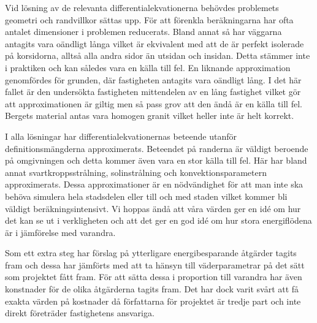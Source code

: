 Vid lösning av de relevanta differentialekvationerna behövdes problemets geometri och randvillkor sättas upp. För
att förenkla beräkningarna har ofta antalet dimensioner i problemen reducerats. Bland annat så har väggarna antagits vara oändligt
långa vilket är ekvivalent med att de är perfekt isolerade på korsidorna, alltså alla andra sidor än utsidan och insidan. Detta stämmer inte
i praktiken och kan således vara en källa till fel. En liknande approximation genomfördes för grunden, där fastigheten
antagits vara oändligt lång. I det här fallet är den undersökta fastigheten mittendelen av en lång fastighet vilket
gör att approximationen är giltig men så pass grov att den ändå är en källa till fel. Bergets material antas vara homogen granit vilket
heller inte är helt korrekt. 

I alla lösningar har differentialekvationernas beteende utanför definitionsmängderna approximerats. Beteendet på randerna
är väldigt beroende på omgivningen och detta kommer även vara en stor källa till fel. Här har bland annat svartkroppsstrålning,
solinstrålning och konvektionsparametern approximerats. Dessa approximationer är en nödvändighet för att man inte ska behöva
simulera hela stadsdelen eller till och med staden vilket kommer bli väldigt beräkningsintensivt. Vi hoppas ändå att våra
värden ger en idé om hur det kan se ut i verkligheten och att det ger en god idé om hur stora energiflödena är i jämförelse med varandra.

Som ett extra steg har förslag på ytterligare energibesparande åtgärder tagits fram och dessa har jämförts med att ta hänsyn till väderparametrar på det sätt som projektet fått fram. För att sätta dessa i proportion till varandra har även konstnader för de olika åtgärderna tagits fram. Det har dock varit svårt att få exakta värden på kostnader då författarna för projektet är tredje part och inte direkt företräder fastighetens ansvariga.
